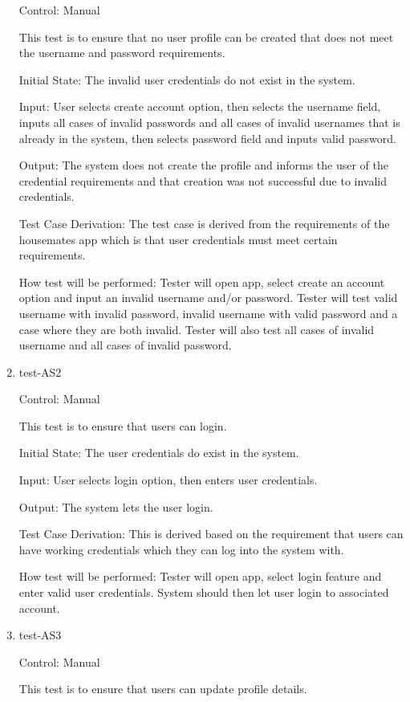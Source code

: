 \documentclass[12pt, titlepage]{article}
\begin{document}
\begin{enumerate}
Control: Manual

This test is to ensure that no user profile can be created that does not meet the username and password requirements.

Initial State: The invalid user credentials do not exist in the system.
					
Input: User selects create account option, then selects the username field, inputs all cases of invalid passwords and all cases of invalid usernames that is already in the system, then selects password field and inputs valid password.
					
Output: The system does not create the profile and informs the user of the credential requirements and that creation was not successful due to invalid credentials.

Test Case Derivation: The test case is derived from the requirements of the housemates app which is that user credentials must meet certain requirements.

How test will be performed: Tester will open app, select create an account option and input an invalid username and/or password. Tester will test valid username with invalid password, invalid username with valid password and a case where they are both invalid. Tester will also test all cases of invalid username and all cases of invalid password.

\item{test-AS2\\}

Control: Manual

This test is to ensure that users can login.

Initial State: The  user credentials do exist in the system.
					
Input: User selects login option, then enters user credentials.
					
Output: The system lets the user login.

Test Case Derivation: This is derived based on the requirement that users can have working credentials which they can log into the system with.

How test will be performed: Tester will open app, select login feature and enter valid user credentials. System should then let user login to associated account.


\item{test-AS3\\}

Control: Manual

This test is to ensure that users can update profile details.


\end{enumerate}
\end{document}
